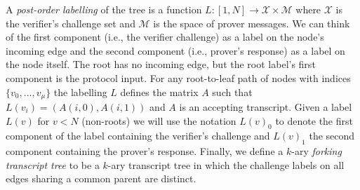 A \emph{post-order labelling} of the tree is a function $L:[1,N] \rightarrow \mathcal{X} \times \mathcal{M}$ where $\mathcal{X}$ is the verifier's challenge set and $\mathcal{M}$ is the space of prover messages. We can think of the first component (i.e., the verifier challenge) as a label on the node's incoming edge and the second component (i.e., prover's response) as a label on the node itself. The root has no incoming edge, but the root label's first component is the protocol input. For any root-to-leaf path of nodes with indices $\{v_0,...,v_\mu\}$ the labelling $L$ defines the matrix $A$ such that $L(v_i) = (A(i, 0), A(i, 1))$ and $A$ is an accepting transcript. Given a label $L(v)$ for $v < N$ (non-roots) we will use the notation $L(v)_0$ to denote the first component of the label containing the verifier's challenge and $L(v)_1$ the second component containing the prover's response. Finally, we define a $k$-ary \emph{forking transcript tree} to be a $k$-ary transcript tree in which the challenge labels on all edges sharing a common parent are distinct.


